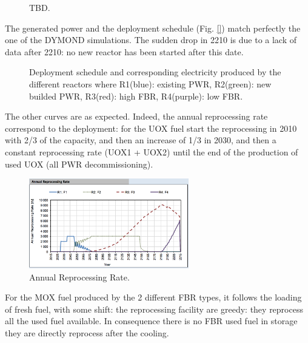 \documentclass[12pt]{article}
\begin{document}
\begin{figure}[h!]
\centering
{}
\caption{TBD.\label{fig:RessourceUsed} }
\end{figure}

The generated power and the deployment schedule
(Fig. \ref{})  match perfectly the one of the
DYMOND simulations. The sudden drop in 2210 is
due to a lack of data after 2210: no new reactor
has been started after this date.\\

\begin{figure}[h!]
\centering
{}
\caption{Deployment schedule and corresponding
electricity produced by the different reactors
where R1(blue): existing PWR, R2(green): new
builded PWR, R3(red): high FBR, R4(purple): low
FBR.\label{fig:deployment_bis} }
\end{figure}


The other curves are as expected. Indeed, the
annual reprocessing rate correspond to the
deployment:  for the UOX fuel start the
reprocessing in 2010 with 2/3 of the capacity, and
then an increase of 1/3 in 2030, and then a
constant reprocessing rate (UOX1 + UOX2) until the
end of the production of used UOX (all PWR
decommissioning).


\begin{figure}[h!]
\centering
\includegraphics[width=0.62\textwidth]	{img/AnnualReprocessingRate_1}
\caption{Annual Reprocessing Rate.}
\label{fig:reprocessing_1}
\end{figure}


For the MOX fuel produced by the 2 different FBR
types, it follows the loading of fresh fuel, with
some shift: the reprocessing facility are greedy:
they reprocess all the used fuel available. In
consequence there is no FBR used fuel in storage
they are directly reprocess after the cooling.
\end{document}
